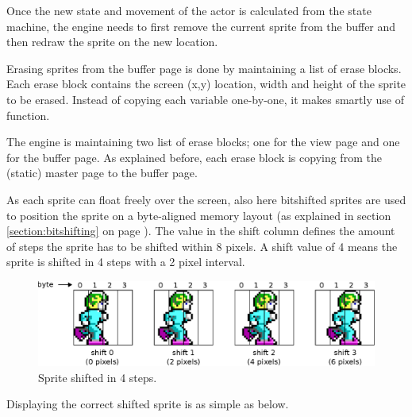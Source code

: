 \documentclass[book.tex]{subfiles}
\begin{document}
Once the new state and movement of the actor is calculated from the state machine, the engine needs to first remove the current sprite from the buffer and then redraw the sprite on the new location.\\

\par
Erasing sprites from the buffer page is done by maintaining a list of erase blocks. Each erase block contains the screen (x,y) location, width and height of the sprite to be erased. Instead of copying each variable one-by-one, it makes smartly use of  function. \\

\par
\begin{minipage}{\textwidth}
  
\end{minipage}
\par

The engine is maintaining two list of erase blocks; one for the view page and one for the buffer page. As explained before, each erase block is copying from the (static) master page to the buffer page.\\

\par
As each sprite can float freely over the screen, also here bitshifted sprites are used to position the sprite on a byte-aligned memory layout (as explained in section \ref{section:bitshifting} on page \pageref{section:bitshifting}). The value in the shift column defines the amount of steps the sprite has to be shifted within 8 pixels. A shift value of 4 means the sprite is shifted in 4 steps with a 2 pixel interval.\\ 

\begin{figure}[H]
  \centering
  \includegraphics[width=\textwidth]{imgs/drawings/sprite_shift.eps}
  \caption{Sprite shifted in 4 steps.}
  \label{fig:sprite_shift}  
\end{figure}
\par
Displaying the correct shifted sprite is as simple as below.
\\
\par
\begin{minipage}{\textwidth}
  
\end{minipage}
\label{state_type}
\par
\end{document}
